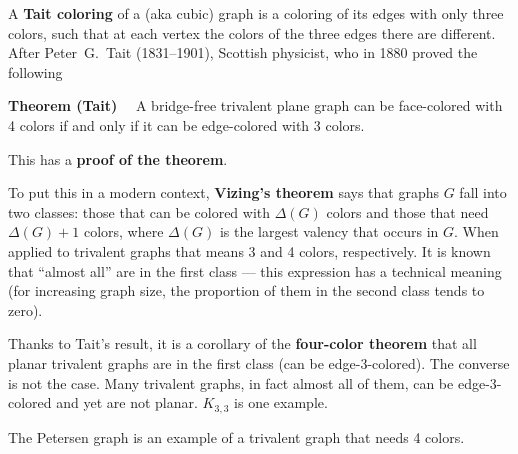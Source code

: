 \documentclass[12pt]{article}
\begin{document}

A {\bf Tait coloring} of a  (aka cubic) graph is a coloring of its edges with only three colors, such that at each vertex the colors of the three edges there are different. After Peter~G.\ Tait (1831--1901), Scottish physicist, who in 1880 proved the following

{\bf Theorem (Tait)}$\quad$ A bridge-free trivalent plane graph can be
face-colored with 4 colors if and only if it can be edge-colored with 3
colors.

This 
has a {\bf proof of the theorem}.

To put this in a modern context, {\bf Vizing's theorem} says that graphs $G$
fall into two classes: those that can be colored with $\Delta(G)$ colors and
those that need $\Delta(G)+1$ colors, where $\Delta(G)$ is the largest valency
that occurs in $G$. When applied to trivalent graphs that means 3 and 4
colors, respectively. It is known that ``almost all'' are in the first class
--- this expression has a technical meaning (for increasing graph size, the
proportion of them in the second class tends to zero).

Thanks to Tait's result, it is a corollary of the {\bf four-color theorem}
that all planar trivalent graphs are in the first class (can be edge-3-colored).
The converse is not the case. Many trivalent graphs, in fact almost all of
them, can be edge-3-colored and yet are not planar. $K_{3,3}$ is one example.

%

The Petersen graph is an example of a trivalent graph that needs 4 colors.
\end{document}
